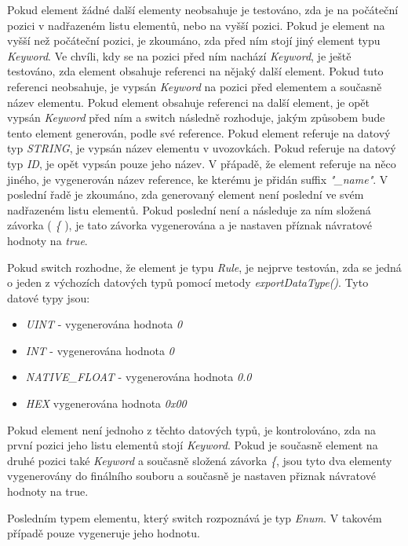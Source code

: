 Pokud element žádné další elementy neobsahuje je testováno, zda je na počáteční pozici v nadřazeném listu elementů, nebo na vyšší pozici. Pokud je element na vyšší než počáteční pozici, je zkoumáno, zda před ním stojí jiný element typu \textit{Keyword}. Ve chvíli, kdy se na pozici před ním nachází \textit{Keyword}, je ještě testováno, zda element obsahuje referenci na nějaký další element. Pokud tuto referenci neobsahuje, je vypsán \textit{Keyword} na pozici před elementem a současně název elementu. Pokud element obsahuje referenci na další element, je opět vypsán \textit{Keyword} před ním a switch následně rozhoduje, jakým způsobem bude tento element generován, podle své reference. Pokud element referuje na datový typ \textit{STRING}, je vypsán název elementu v uvozovkách. Pokud referuje na datový typ \textit{ID}, je opět vypsán pouze jeho název. V přápadě, že element referuje na něco jiného, je vygenerován název reference, ke kterému je přidán suffix \textit{"\_name"}. V poslední řadě je zkoumáno, zda generovaný element není poslední ve svém nadřazeném listu elementů. Pokud poslední není a následuje za ním složená závorka ( \textit{\{} ), je tato závorka vygenerována a je nastaven příznak návratové hodnoty na \textit{true}.

Pokud switch rozhodne, že element je typu \textit{Rule}, je nejprve testován, zda se jedná o jeden z výchozích datových typů pomocí metody \textit{exportDataType()}. Tyto datové typy jsou:

\begin{itemize}
	\item \textit{UINT} - vygenerována hodnota \textit{0}
	\item \textit{INT} - vygenerována hodnota \textit{0}
	\item \textit{NATIVE\_FLOAT} - vygenerována hodnota \textit{0.0}
	\item \textit{HEX} vygenerována hodnota \textit{0x00}
\end{itemize}

Pokud element není jednoho z těchto datových typů, je kontrolováno, zda na první pozici jeho listu elementů stojí \textit{Keyword}. Pokud je současně element na druhé pozici také \textit{Keyword} a současně složená závorka \textit{\{}, jsou tyto dva elementy vygenerovány do finálního souboru a současně je nastaven přiznak návratové hodnoty na true.

Posledním typem elementu, který switch rozpoznává je typ \textit{Enum}. V takovém případě pouze vygeneruje jeho hodnotu.






















